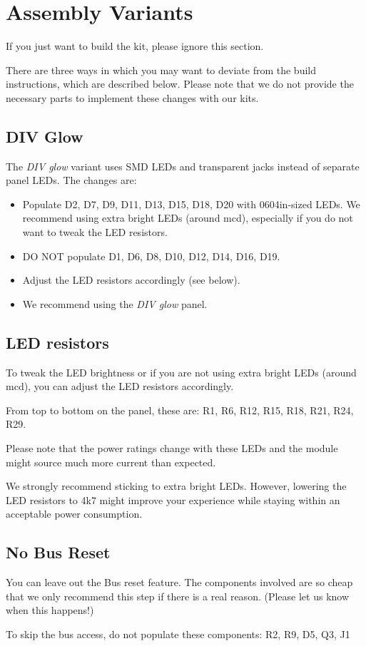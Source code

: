 \documentclass[a4paper,
               11pt,
               parskip=half,
               headinclude,
               titlepage=false]{scrartcl}
\begin{document}
\newpage



\section*{Assembly Variants}

If you just want to build the kit, please ignore this section.

There are three ways in which you may want to deviate from the build instructions, which are described below.
Please note that we do not provide the necessary parts to implement these changes with our kits. 

\subsection*{DIV Glow}

The \emph{DIV glow} variant uses SMD LEDs and transparent jacks instead of separate panel LEDs. The changes are:
\begin{itemize}[noitemsep]
 \item Populate D2, D7, D9, D11, D13, D15, D18, D20 with 0604in-sized LEDs. We recommend using extra bright LEDs (around \unit[200]{mcd}), especially if you do not want to tweak the LED resistors. 
 \item DO NOT populate D1, D6, D8, D10, D12, D14, D16, D19.
 \item Adjust the LED resistors accordingly (see below).
 \item We recommend using the \emph{DIV glow} panel.
\end{itemize}

\subsection*{LED resistors}

To tweak the LED brightness or if you are not using extra bright LEDs (around \unit[200]{mcd}), you can adjust the LED resistors accordingly.

From top to bottom on the panel, these are: R1, R6, R12, R15, R18, R21, R24, R29.

Please note that the power ratings change with these LEDs and the module might source much more current than expected.

We strongly recommend sticking to extra bright LEDs. However, lowering the LED resistors to 4k7 might improve your experience while staying within an acceptable power consumption.

\subsection*{No Bus Reset}

You can leave out the Bus reset feature. The components involved are so cheap that we only recommend this step if there is a real reason. (Please let us know when this happens!)

To skip the bus access, do not populate these components: R2, R9, D5, Q3, J1
\end{document}
